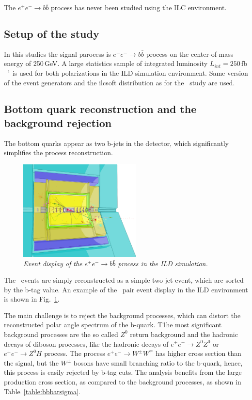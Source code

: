 The $e^+e^-\to b\bar{b}$ process has never been studied using the ILC environment. 
\subsection{Setup of the study}
In this studies the signal parocess is $e^+e^-\to b\bar{b}$ process on the center-of-mass energy of 250\,GeV. 
A large statistics sample of integrated luminosity $L_{int}= 250$\,fb{$^{-1}$} is used for both polarizations in the ILD simulation environment. 
Same version of the event generators and the {\sc ilcsoft} distribution as for the \ttbar\ study are used.


\subsection{Bottom quark reconstruction and the background rejection}
The bottom quarks appear as two b-jets in the detector, which significantly simplifies the process reconstruction. 
\begin{figure}[h]
	{\centering
		\includegraphics[width=0.55\textwidth]{ILD/graphics/ild-bbbar.png}
		\caption{\sl Event display of the $e^+e^-\to b\bar{b}$ process in the ILD simulation.
		}
		\label{fig:BottomEvent_3}
	}
	
\end{figure}
The \bbbar\ events are simply reconstructed as a simple two jet event, which are sorted by the b-tag value.
An example of the \bbbar\ pair event display in the ILD environment is shown in Fig.~\ref{fig:BottomEvent_3}. 

The main challenge is to reject the background processes, which can distort the reconstructed polar angle spectrum of the b-quark. 
T1he most significant background processes are the so called $Z^0$ return background and the hadronic decays of diboson processes, like the hadronic decays of $e^+e^-\to Z^0Z^0$ or $e^+e^-\to Z^0H$ process. The process $e^+e^-\to W^\pm W^\mp$ has higher cross section than the signal, but the $W^\pm$ bosons have small branching ratio to the b-quark, hence, this process is easily rejected by b-tag cuts. 
The analysis benefits from the large production cross section, as compared to the background processes, as shown in Table~\ref{table:bbbarsigma}.


